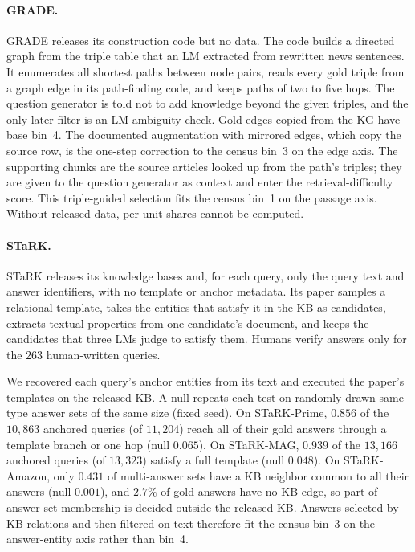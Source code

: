 \documentclass[11pt]{article}
\begin{document}
\paragraph{GRADE.} GRADE releases its construction code but no data. The code builds a directed graph from the triple table that an LM extracted from rewritten news sentences. It enumerates all shortest paths between node pairs, reads every gold triple from a graph edge in its path-finding code, and keeps paths of two to five hops. The question generator is told not to add knowledge beyond the given triples, and the only later filter is an LM ambiguity check. Gold edges copied from the KG have base bin~4. The documented augmentation with mirrored edges, which copy the source row, is the one-step correction to the census bin~3 on the edge axis. The supporting chunks are the source articles looked up from the path's triples; they are given to the question generator as context and enter the retrieval-difficulty score. This triple-guided selection fits the census bin~1 on the passage axis. Without released data, per-unit shares cannot be computed.

\paragraph{STaRK.} STaRK releases its knowledge bases and, for each query, only the query text and answer identifiers, with no template or anchor metadata. Its paper samples a relational template, takes the entities that satisfy it in the KB as candidates, extracts textual properties from one candidate's document, and keeps the candidates that three LMs judge to satisfy them. Humans verify answers only for the $263$ human-written queries.

We recovered each query's anchor entities from its text and executed the paper's templates on the released KB. A null repeats each test on randomly drawn same-type answer sets of the same size (fixed seed). On STaRK-Prime, $0.856$ of the $10{,}863$ anchored queries (of $11{,}204$) reach all of their gold answers through a template branch or one hop (null $0.065$). On STaRK-MAG, $0.939$ of the $13{,}166$ anchored queries (of $13{,}323$) satisfy a full template (null $0.048$). On STaRK-Amazon, only $0.431$ of multi-answer sets have a KB neighbor common to all their answers (null $0.001$), and $2.7\%$ of gold answers have no KB edge, so part of answer-set membership is decided outside the released KB. Answers selected by KB relations and then filtered on text therefore fit the census bin~3 on the answer-entity axis rather than bin~4.
\end{document}
